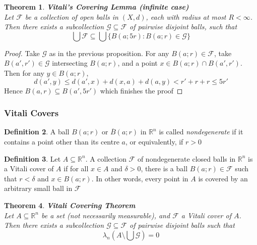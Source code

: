 \documentclass{article}
\theoremstyle{plain}
\newtheorem{thm}{Theorem}[section]
\theoremstyle{definition}
\newtheorem{defn}[thm]{Definition}
\theoremstyle{remark}
\begin{document}
\begin{thm}{\textbf{Vitali's Covering Lemma (infinite case)}}\label{thm:vitali_inf}
    ~\\Let $\mathcal{F}$ be a collection of open balls in $(X,d)$, each with radius at most $R < \infty$. Then there exists a subcollection $\mathcal{G} \subseteq \mathcal{F}$ of pairwise disjoint balls, such that
    \[
    \bigcup \mathcal{F} \subseteq \bigcup \{B(a;5r): B(a;r) \in \mathcal{G}\}
    \]
\end{thm}

\begin{proof}
    Take $\mathcal{G}$ as in the previous proposition. For any $B(a;r) \in \mathcal{F}$, take $B(a', r') \in \mathcal{G}$ intersecting $B(a;r)$, and a point $x \in B(a;r) \cap B(a', r')$. Then for any $y \in B(a;r)$, \[
    d(a',y) \le d(a', x) + d(x,a) + d(a,y) <r' +r+r\le 5r'
    \]
    Hence $B(a,r) \subseteq B(a', 5r')$ which finishes the proof
\end{proof}

\subsubsection*{Vitali Covers}

\begin{defn}
    A ball $B(a;r)$ or $\overline{B}(a;r)$ in $\mathbb{R}^n$ is called \textit{nondegenerate} if it contains a point other than its centre $a$, or equivalently, if $r > 0$
\end{defn}

\begin{defn}
    Let $A \subseteq \mathbb{R}^n$. A collection $\mathcal{F}$ of nondegenerate closed balls in $\mathbb{R}^n$ is a Vitali cover of $A$ if for all $x\in A$ and $\delta >0$, there is a ball $B(a;r) \in \mathcal{F}$ such that $r < \delta$ and $x\in B(a;r)$. In other words, every point in $A$ is covered by an arbitrary small ball in $\mathcal{F}$
\end{defn}

\begin{thm}{\textbf{Vitali Covering Theorem}}~\\
    Let $A \subseteq \mathbb{R}^n$ be a set (not necessarily measurable), and $\mathcal{F}$ a Vitali cover of $A$. Then there exists a subcollection $\mathcal{G} \subseteq \mathcal{F}$ of pairwise disjoint balls such that \[
    \lambda _n \left ( A \setminus \bigcup \mathcal{G} \right ) = 0
    \]
    
\end{thm}
\end{document}
